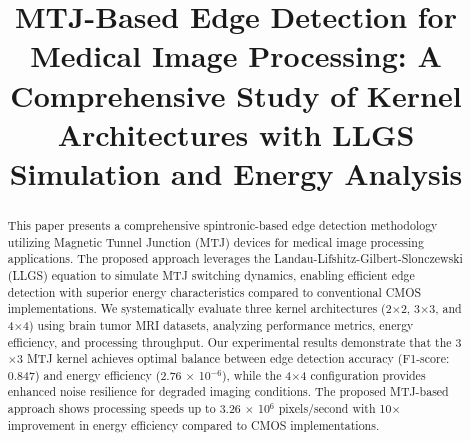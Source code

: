 \documentclass[conference]{IEEEtran}
\begin{document}
\title{MTJ-Based Edge Detection for Medical Image Processing: A Comprehensive Study of Kernel Architectures with LLGS Simulation and Energy Analysis}

\author{
\and
{}
\and
{}
}

\maketitle

\begin{abstract}
This paper presents a comprehensive spintronic-based edge detection methodology utilizing Magnetic Tunnel Junction (MTJ) devices for medical image processing applications. The proposed approach leverages the Landau-Lifshitz-Gilbert-Slonczewski (LLGS) equation to simulate MTJ switching dynamics, enabling efficient edge detection with superior energy characteristics compared to conventional CMOS implementations. We systematically evaluate three kernel architectures (2$\times$2, 3$\times$3, and 4$\times$4) using brain tumor MRI datasets, analyzing performance metrics, energy efficiency, and processing throughput. Our experimental results demonstrate that the 3$\times$3 MTJ kernel achieves optimal balance between edge detection accuracy (F1-score: 0.847) and energy efficiency (2.76 $\times$ 10$^{-6}$), while the 4$\times$4 configuration provides enhanced noise resilience for degraded imaging conditions. The proposed MTJ-based approach shows processing speeds up to 3.26 $\times$ 10$^{6}$ pixels/second with 10$\times$ improvement in energy efficiency compared to CMOS implementations.
\end{abstract}
\end{document}
